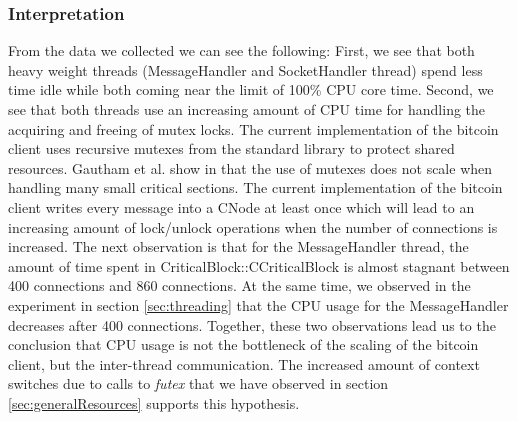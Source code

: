 \subsubsection{Interpretation}
From the data we collected we can see the following: 
First, we see that both heavy weight threads (MessageHandler and SocketHandler thread) spend less time idle while both coming near the limit of 100\% CPU core time. 
Second, we see that both threads use an increasing amount of CPU time for handling the acquiring and freeing of mutex locks. The current implementation of the bitcoin client uses recursive mutexes from the standard library to protect shared resources. Gautham et al. show in \cite{gautham2012implications} that the use of mutexes does not scale when handling many small critical sections. The current implementation of the bitcoin client writes every message into a CNode at least once which will lead to an increasing amount of lock/unlock operations when the number of connections is increased. 
The next observation is that for the MessageHandler thread, the amount of time spent in CriticalBlock::CCriticalBlock is almost stagnant between 400 connections and 860 connections. At the same time, we observed in the experiment in section \ref{sec:threading} that the CPU usage for the MessageHandler decreases after 400 connections. Together, these two observations lead us to the conclusion that CPU usage is not the bottleneck of the scaling of the bitcoin client, but the inter-thread communication. The increased amount of context switches due to calls to \textit{futex} that we have observed in section \ref{sec:generalResources} supports this hypothesis.


